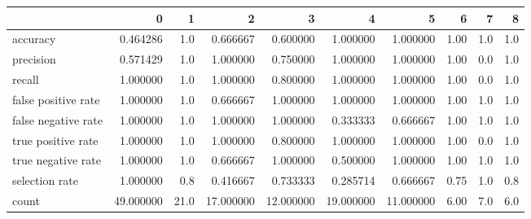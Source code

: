 \begin{tabular}{lrrrrrrrrr}
\toprule
{} &          0 &     1 &          2 &          3 &          4 &          5 &     6 &    7 &    8 \\
\midrule
accuracy            &   0.464286 &   1.0 &   0.666667 &   0.600000 &   1.000000 &   1.000000 &  1.00 &  1.0 &  1.0 \\
precision           &   0.571429 &   1.0 &   1.000000 &   0.750000 &   1.000000 &   1.000000 &  1.00 &  0.0 &  1.0 \\
recall              &   1.000000 &   1.0 &   1.000000 &   0.800000 &   1.000000 &   1.000000 &  1.00 &  0.0 &  1.0 \\
false positive rate &   1.000000 &   1.0 &   0.666667 &   1.000000 &   1.000000 &   1.000000 &  1.00 &  1.0 &  1.0 \\
false negative rate &   1.000000 &   1.0 &   1.000000 &   1.000000 &   0.333333 &   0.666667 &  1.00 &  1.0 &  1.0 \\
true positive rate  &   1.000000 &   1.0 &   1.000000 &   0.800000 &   1.000000 &   1.000000 &  1.00 &  0.0 &  1.0 \\
true negative rate  &   1.000000 &   1.0 &   0.666667 &   1.000000 &   0.500000 &   1.000000 &  1.00 &  1.0 &  1.0 \\
selection rate      &   1.000000 &   0.8 &   0.416667 &   0.733333 &   0.285714 &   0.666667 &  0.75 &  1.0 &  0.8 \\
count               &  49.000000 &  21.0 &  17.000000 &  12.000000 &  19.000000 &  11.000000 &  6.00 &  7.0 &  6.0 \\
\bottomrule
\end{tabular}
